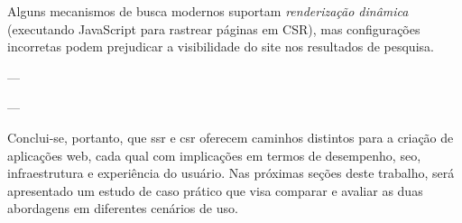 Alguns mecanismos de busca modernos suportam \textit{renderização dinâmica} (executando JavaScript para rastrear páginas em CSR), mas configurações incorretas podem prejudicar a visibilidade do site nos resultados de pesquisa.

---

---

\noindent
Conclui-se, portanto, que \acrshort{ssr} e \acrshort{csr} oferecem caminhos distintos para a criação de aplicações web, cada qual com implicações em termos de desempenho, \acrshort{seo}, infraestrutura e experiência do usuário. Nas próximas seções deste trabalho, será apresentado um estudo de caso prático que visa comparar e avaliar as duas abordagens em diferentes cenários de uso.

\label{s2}


